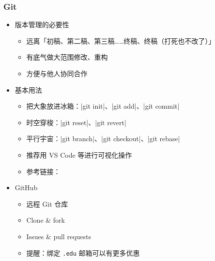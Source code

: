 \begin{frame}[fragile]
\frametitle{Git}
\begin{itemize}
  \item<+-> 版本管理的必要性

    \begin{itemize}
      \item 远离「初稿、第二稿、第三稿……终稿、终稿（打死也不改了）」
      \item 有底气做大范围修改、重构
      \item 方便与他人协同合作
    \end{itemize}

  \item<+-> 基本用法

    \begin{itemize}
      \item 把大象放进冰箱：|git init|、|git add|、|git commit|
      \item 时空穿梭：|git reset|、|git revert|
      \item 平行宇宙：|git branch|、|git checkout|、|git rebase|
      \item 推荐用 VS Code 等进行可视化操作
      \item 参考链接：
    \end{itemize}

  \item<+-> GitHub \href{https://github.com}{\faGithub}

    \begin{itemize}
      \item 远程 Git 仓库
      \item Clone \& fork
      \item Issues \& pull requests
      \item<+-> \alert{提醒：绑定 \texttt{.edu} 邮箱可以有更多优惠}
    \end{itemize}
\end{itemize}
\end{frame}

